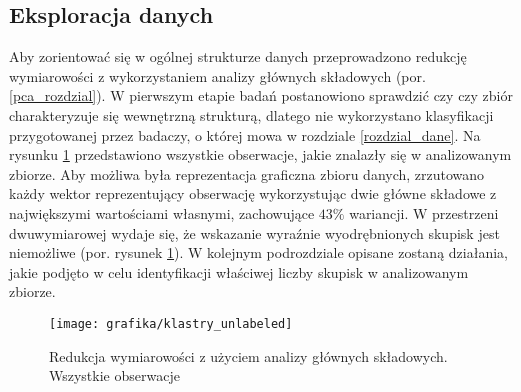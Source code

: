 \documentclass{article}
\begin{document}
\subsection{Eksploracja danych}
\label{roz_eksploracja_danych}
Aby zorientować się w ogólnej strukturze danych przeprowadzono redukcję wymiarowości z wykorzystaniem analizy głównych składowych (por. \ref{pca_rozdzial}).
W pierwszym etapie badań postanowiono sprawdzić czy czy zbiór charakteryzuje się wewnętrzną strukturą, dlatego nie wykorzystano klasyfikacji przygotowanej przez badaczy, o której mowa w rozdziale \ref{rozdzial_dane}.
Na rysunku \ref{rys_pca_unlabeled} przedstawiono wszystkie obserwacje, jakie znalazły się w analizowanym zbiorze.  
Aby możliwa była reprezentacja graficzna zbioru danych, zrzutowano każdy wektor reprezentujący obserwację wykorzystując dwie główne składowe z największymi wartościami własnymi, zachowujące $43\%$ wariancji.
W przestrzeni dwuwymiarowej wydaje się, że wskazanie wyraźnie wyodrębnionych skupisk jest niemożliwe (por. rysunek \ref{rys_pca_unlabeled}). 
W kolejnym podrozdziale opisane zostaną działania, jakie podjęto w celu identyfikacji właściwej liczby skupisk w analizowanym zbiorze.
\begin{figure}[H]
\texttt{[image: grafika/klastry\_unlabeled]}
\caption{Redukcja wymiarowości z użyciem analizy głównych składowych. Wszystkie obserwacje}
\label{rys_pca_unlabeled}

\end{figure}

\FloatBarrier
\end{document}
